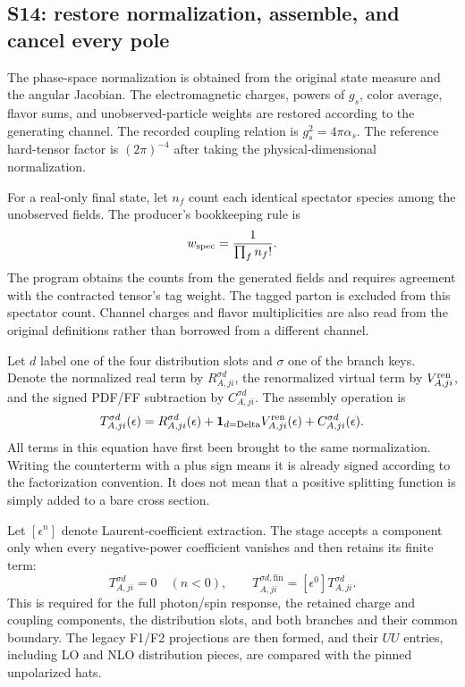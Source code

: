 \documentclass[11pt,a4paper]{article}
\newcommand{\as}{\alpha_s}
\newcommand{\eps}{\epsilon}
\begin{document}
\subsection{S14: restore normalization, assemble, and cancel every pole}
The phase-space normalization is obtained from the original state measure and the angular Jacobian. The electromagnetic charges, powers of $g_s$, color average, flavor sums, and unobserved-particle weights are restored according to the generating channel. The recorded coupling relation is $g_s^2=4\pi\as$. The reference hard-tensor factor is $(2\pi)^{-4}$ after taking the physical-dimensional normalization.

For a real-only final state, let $n_f$ count each identical spectator species among the unobserved fields. The producer's bookkeeping rule is
\begin{equation}
 w_{\rm spec}=\frac{1}{\prod_f n_f!}.
\end{equation}
The program obtains the counts from the generated fields and requires agreement with the contracted tensor's tag weight. The tagged parton is excluded from this spectator count. Channel charges and flavor multiplicities are also read from the original definitions rather than borrowed from a different channel.

Let $d$ label one of the four distribution slots and $\sigma$ one of the branch keys. Denote the normalized real term by $R^{\sigma d}_{A,ji}$, the renormalized virtual term by $V_{A,ji}^{\rm ren}$, and the signed PDF/FF subtraction by $C^{\sigma d}_{A,ji}$. The assembly operation is
\begin{equation}
 T^{\sigma d}_{A,ji}(\eps)
 =R^{\sigma d}_{A,ji}(\eps)
 +\mathbf1_{d=\mathrm{Delta}}V_{A,ji}^{\rm ren}(\eps)
 +C^{\sigma d}_{A,ji}(\eps).
\end{equation}
All terms in this equation have first been brought to the same normalization. Writing the counterterm with a plus sign means it is already signed according to the factorization convention. It does not mean that a positive splitting function is simply added to a bare cross section.

Let $[\eps^n]$ denote Laurent-coefficient extraction. The stage accepts a component only when every negative-power coefficient vanishes and then retains its finite term:
\begin{equation}
 [\eps^n]T^{\sigma d}_{A,ji}=0\quad(n<0),\qquad
 T^{\sigma d,\mathrm{fin}}_{A,ji}=[\eps^0]T^{\sigma d}_{A,ji}.
\end{equation}
This is required for the full photon/spin response, the retained charge and coupling components, the distribution slots, and both branches and their common boundary. The legacy F1/F2 projections are then formed, and their $UU$ entries, including LO and NLO distribution pieces, are compared with the pinned unpolarized hats.
\end{document}
